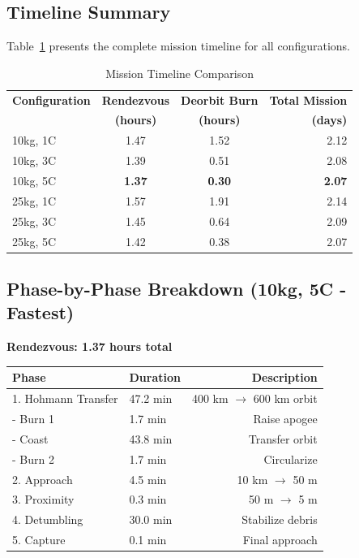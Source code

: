 \documentclass[11pt,a4paper]{article}
\begin{document}
\subsection{Timeline Summary}

Table~\ref{tab:timeline} presents the complete mission timeline for all configurations.

\begin{table}[h!]
\centering
\caption{Mission Timeline Comparison}
\label{tab:timeline}
\small
\begin{tabular}{lccr}
\toprule
\textbf{Configuration} & \textbf{Rendezvous} & \textbf{Deorbit Burn} & \textbf{Total Mission} \\
 & \textbf{(hours)} & \textbf{(hours)} & \textbf{(days)} \\
\midrule
10kg, 1C & 1.47 & 1.52 & 2.12 \\
10kg, 3C & 1.39 & 0.51 & 2.08 \\
\rowcolor{yellow!20}10kg, 5C & \textbf{1.37} & \textbf{0.30} & \textbf{2.07} \\
\midrule
25kg, 1C & 1.57 & 1.91 & 2.14 \\
25kg, 3C & 1.45 & 0.64 & 2.09 \\
25kg, 5C & 1.42 & 0.38 & 2.07 \\
\bottomrule
\end{tabular}
\end{table}

\subsection{Phase-by-Phase Breakdown (10kg, 5C - Fastest)}

\textbf{Rendezvous: 1.37 hours total}

\begin{table}[h!]
\centering
\begin{tabular}{llr}
\toprule
\textbf{Phase} & \textbf{Duration} & \textbf{Description} \\
\midrule
1. Hohmann Transfer & 47.2 min & 400 km $\rightarrow$ 600 km orbit \\
\quad - Burn 1 & 1.7 min & Raise apogee \\
\quad - Coast & 43.8 min & Transfer orbit \\
\quad - Burn 2 & 1.7 min & Circularize \\
2. Approach & 4.5 min & 10 km $\rightarrow$ 50 m \\
3. Proximity & 0.3 min & 50 m $\rightarrow$ 5 m \\
4. Detumbling & 30.0 min & Stabilize debris \\
5. Capture & 0.1 min & Final approach \\
\bottomrule
\end{tabular}
\end{table}
\end{document}
